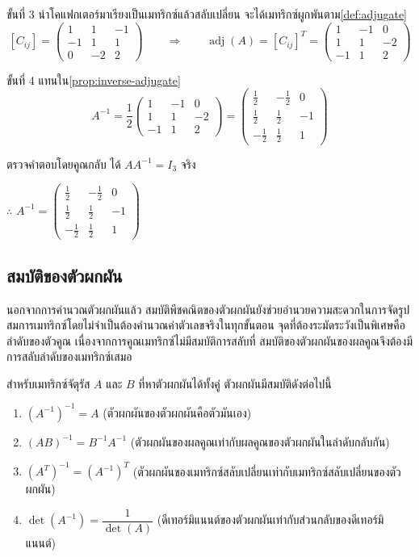\begin{solution}
ขั้นที่ 3 นำโคแฟกเตอร์มาเรียงเป็นเมทริกซ์แล้วสลับเปลี่ยน จะได้เมทริกซ์ผูกพันตาม\autoref{def:adjugate}
\[
[C_{ij}] = \begin{pmatrix} 1 & 1 & -1 \\ -1 & 1 & 1 \\ 0 & -2 & 2 \end{pmatrix}
\qquad\Longrightarrow\qquad
\operatorname{adj}(A) = [C_{ij}]^T = \begin{pmatrix} 1 & -1 & 0 \\ 1 & 1 & -2 \\ -1 & 1 & 2 \end{pmatrix}
\]

ขั้นที่ 4 แทนใน\autoref{prop:inverse-adjugate}
\[ A^{-1} = \frac{1}{2}\begin{pmatrix} 1 & -1 & 0 \\ 1 & 1 & -2 \\ -1 & 1 & 2 \end{pmatrix} = \begin{pmatrix} \tfrac{1}{2} & -\tfrac{1}{2} & 0 \\ \tfrac{1}{2} & \tfrac{1}{2} & -1 \\ -\tfrac{1}{2} & \tfrac{1}{2} & 1 \end{pmatrix} \]

ตรวจคำตอบโดยคูณกลับ ได้ $AA^{-1} = I_3$ จริง

$\therefore$ $A^{-1} = \begin{pmatrix} \tfrac{1}{2} & -\tfrac{1}{2} & 0 \\ \tfrac{1}{2} & \tfrac{1}{2} & -1 \\ -\tfrac{1}{2} & \tfrac{1}{2} & 1 \end{pmatrix}$ \solhere
\end{solution}

\subsection{สมบัติของตัวผกผัน}
\label{ssec:inverse-properties}
นอกจากการคำนวณตัวผกผันแล้ว สมบัติพีชคณิตของตัวผกผันยังช่วยอำนวยความสะดวกในการจัดรูปสมการเมทริกซ์โดยไม่จำเป็นต้องคำนวณค่าตัวเลขจริงในทุกขั้นตอน จุดที่ต้องระมัดระวังเป็นพิเศษคือลำดับของตัวคูณ เนื่องจากการคูณเมทริกซ์ไม่มีสมบัติการสลับที่ สมบัติของตัวผกผันของผลคูณจึงต้องมีการสลับลำดับของเมทริกซ์เสมอ

\begin{prop}
\label{prop:inverse-properties}
สำหรับเมทริกซ์จัตุรัส $A$ และ $B$ ที่หาตัวผกผันได้ทั้งคู่ ตัวผกผันมีสมบัติดังต่อไปนี้
\begin{enumerate}
    \item $(A^{-1})^{-1} = A$ \hfill (ตัวผกผันของตัวผกผันคือตัวมันเอง)
    \item $(AB)^{-1} = B^{-1} A^{-1}$ \hfill (ตัวผกผันของผลคูณเท่ากับผลคูณของตัวผกผันในลำดับกลับกัน)
    \item $(A^T)^{-1} = (A^{-1})^T$ \hfill (ตัวผกผันของเมทริกซ์สลับเปลี่ยนเท่ากับเมทริกซ์สลับเปลี่ยนของตัวผกผัน)
    \item $\det(A^{-1}) = \dfrac{1}{\det(A)}$ \hfill (ดีเทอร์มิแนนต์ของตัวผกผันเท่ากับส่วนกลับของดีเทอร์มิแนนต์)
\end{enumerate}
\end{prop}

